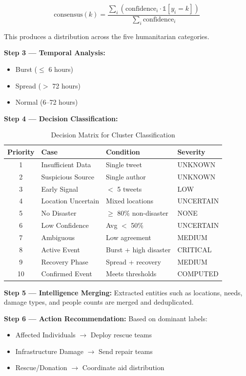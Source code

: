 \documentclass[pdflatex,sn-mathphys-num]{sn-jnl}%
\theoremstyle{thmstyleone}%
\theoremstyle{thmstyletwo}%
\theoremstyle{thmstylethree}%
\begin{document}
\begin{equation}
\text{consensus}(k) = \frac{\sum_i (\text{confidence}_i \cdot \mathbb{1}[y_i = k])}{\sum_i \text{confidence}_i}
\end{equation}

This produces a distribution across the five humanitarian categories.

\textbf{Step 3 — Temporal Analysis:}

\begin{itemize}
    \item Burst ($\leq$ 6 hours)
    \item Spread ($>$ 72 hours)
    \item Normal (6–72 hours)
\end{itemize}

\textbf{Step 4 — Decision Classification:}

\begin{table}[h]
\centering
\caption{Decision Matrix for Cluster Classification}
\label{tab:decision}
\begin{tabular}{|c|l|l|l|}
\hline
\textbf{Priority} & \textbf{Case} & \textbf{Condition} & \textbf{Severity} \\
\hline
1 & Insufficient Data & Single tweet & UNKNOWN \\
2 & Suspicious Source & Single author & UNKNOWN \\
3 & Early Signal & $<$ 5 tweets & LOW \\
4 & Location Uncertain & Mixed locations & UNCERTAIN \\
5 & No Disaster & $\geq$ 80\% non-disaster & NONE \\
6 & Low Confidence & Avg $<$ 50\% & UNCERTAIN \\
7 & Ambiguous & Low agreement & MEDIUM \\
8 & Active Event & Burst + high disaster & CRITICAL \\
9 & Recovery Phase & Spread + recovery & MEDIUM \\
10 & Confirmed Event & Meets thresholds & COMPUTED \\
\hline
\end{tabular}
\end{table}

\textbf{Step 5 — Intelligence Merging:} Extracted entities such as locations, needs, damage types, and people counts are merged and deduplicated.

\textbf{Step 6 — Action Recommendation:} Based on dominant labels:
\begin{itemize}
    \item Affected Individuals $\rightarrow$ Deploy rescue teams
    \item Infrastructure Damage $\rightarrow$ Send repair teams
    \item Rescue/Donation $\rightarrow$ Coordinate aid distribution
\end{itemize}
\end{document}
